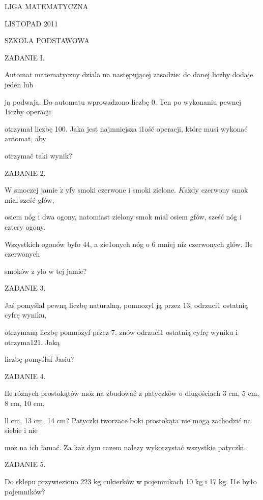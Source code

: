\documentclass[a4paper,12pt]{article}
\begin{document}
LIGA MATEMATYCZNA

LISTOPAD 2011

SZKOLA PODSTAWOWA

ZADANIE I.

Automat matematyczny dziala na następującej zasadzie: do danej liczby dodaje jeden lub

ją podwaja. Do automatu wprowadzono liczbę 0. Ten po wykonaniu pewnej 1iczby operacji

otrzymał liczbę 100. Jaka jest najmniejsza i1ość operacji, które musi wykonać automat, aby

otrzymač taki wynik?

ZADANIE 2.

$\mathrm{W}$ smoczej jamie $\dot{\mathrm{z}}$ yfy smoki czerwone i smoki zielone. $K\mathrm{a}\dot{\mathrm{z}}\mathrm{d}\mathrm{y}$ czerwony smok mial sześć gfów,

osiem nóg i dwa ogony, natomiast zielony smok mial osiem gfów, sześć nóg i cztery ogony.

Wszystkich ogonów byfo 44, a zie1onych nóg o 6 mniej $\mathrm{n}\mathrm{i}\dot{\mathrm{z}}$ czerwonych glów. Ile czerwonych

smoków $\dot{\mathrm{z}}$ ylo w tej jamie?

ZADANIE 3.

Jaś pomyślal pewną liczbę naturalną, pomnozyl ją przez 13, odrzuci1 ostatnią cyfrę wyniku,

otrzymaną liczbę pomnozyf przez 7, znów odrzuci1 ostatnią cyfrę wyniku i otrzyma121. Jaką

liczbę pomyślaf Jasiu?

ZADANIE 4.

Ile róznych prostokątów $\mathrm{m}\mathrm{o}\dot{\mathrm{z}}$ na zbudować z patyczków o dlugościach 3 cm, 5 cm, 8 cm, 10 cm,

ll cm, 13 cm, 14 cm? Patyczki tworzace boki prostokąta nie mogą zachodzić na siebie i nie

$\mathrm{m}\mathrm{o}\dot{\mathrm{z}}$ na ich łamać. Za $\mathrm{k}\mathrm{a}\dot{\mathrm{z}}$ dym razem nalezy wykorzystać wszystkie patyczki.

ZADANIE 5.

Do sklepu przywieziono 223 kg cukierków w pojemnikach 10 kg i 17 kg. I1e by1o pojemników?
\end{document}
